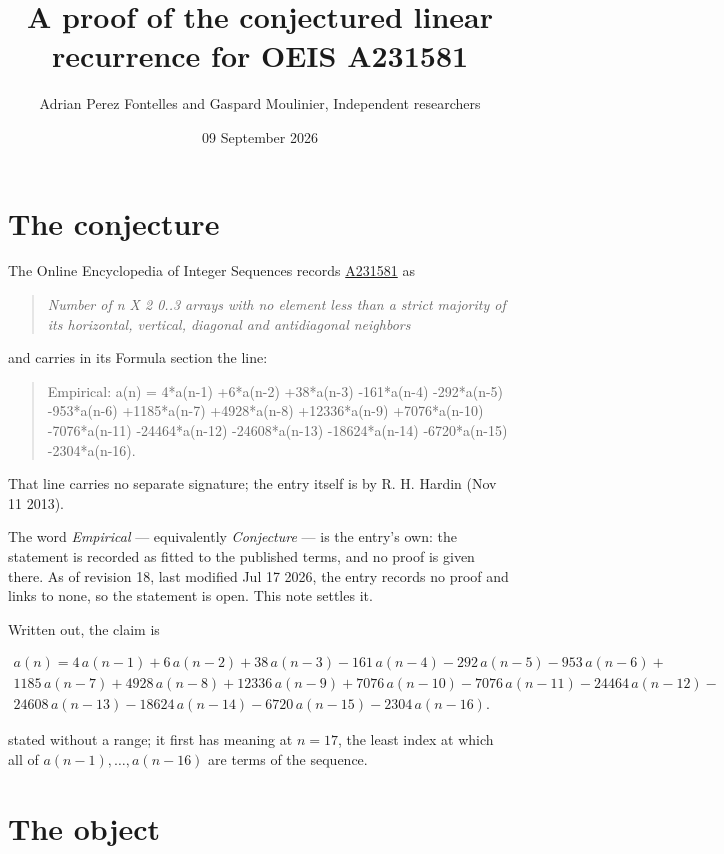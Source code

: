 \documentclass[11pt]{article}
\title{A proof of the conjectured linear recurrence for OEIS A231581}
\author{Adrian Perez Fontelles and Gaspard Moulinier, Independent researchers}
\date{09 September 2026}
\theoremstyle{definition}
\begin{document}
\maketitle
\section{The conjecture}

The Online Encyclopedia of Integer Sequences records \href{https://oeis.org/A231581}{A231581} as

\begin{quote}\itshape Number of n X 2 0..3 arrays with no element less than a strict majority of its horizontal, vertical, diagonal and antidiagonal neighbors\end{quote}

and carries in its Formula section the line:

\begin{quote}\ttfamily Empirical: a(n) = 4*a(n-1) +6*a(n-2) +38*a(n-3) -161*a(n-4) -292*a(n-5) -953*a(n-6) +1185*a(n-7) +4928*a(n-8) +12336*a(n-9) +7076*a(n-10) -7076*a(n-11) -24464*a(n-12) -24608*a(n-13) -18624*a(n-14) -6720*a(n-15) -2304*a(n-16).\end{quote}

That line carries no separate signature; the entry itself is by R. H. Hardin (Nov 11 2013).

The word {\itshape Empirical} --- equivalently {\itshape Conjecture} --- is the entry's own: the statement is recorded as fitted to the published terms, and no proof is given there. As of revision 18, last modified Jul 17 2026, the entry records no proof and links to none, so the statement is open. This note settles it.

Written out, the claim is

\begin{multline*} a(n) = 4\,a(n-1) + 6\,a(n-2) + 38\,a(n-3) - 161\,a(n-4) - 292\,a(n-5) - 953\,a(n-6) + \\ 1185\,a(n-7) + 4928\,a(n-8) + 12336\,a(n-9) + 7076\,a(n-10) - 7076\,a(n-11) - 24464\,a(n-12) - \\ 24608\,a(n-13) - 18624\,a(n-14) - 6720\,a(n-15) - 2304\,a(n-16). \end{multline*}

stated without a range; it first has meaning at $n = 17$, the least index at which all of $a(n-1),\dots,a(n-16)$ are terms of the sequence.

\section{The object}
\end{document}
